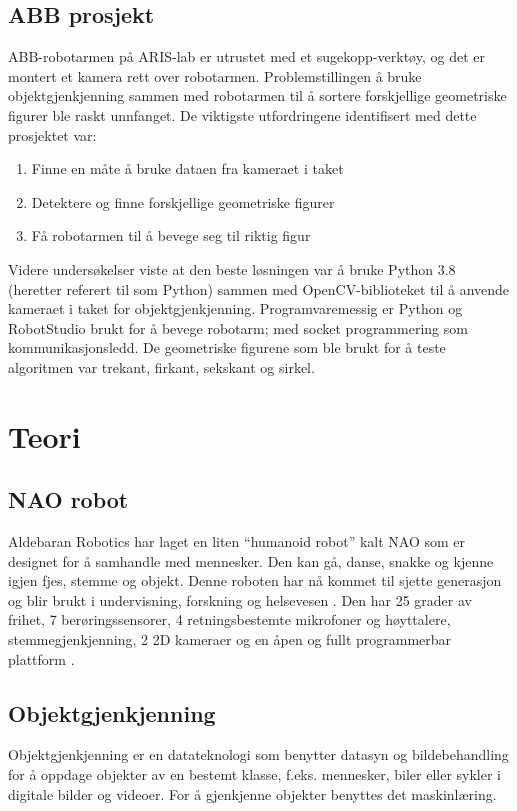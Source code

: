 \documentclass[conference]{IEEEtran}
\begin{document}
    \subsection{ABB prosjekt}
    ABB-robotarmen på ARIS-lab er utrustet med et sugekopp-verktøy, og det er montert et kamera rett over robotarmen. Problemstillingen å bruke objektgjenkjenning sammen med robotarmen til å sortere forskjellige geometriske figurer ble raskt unnfanget. De viktigste utfordringene identifisert med dette prosjektet var:
        \begin{enumerate}
            \item Finne en måte å bruke dataen fra kameraet i taket
            \item Detektere og finne forskjellige geometriske figurer
            \item Få robotarmen til å bevege seg til riktig figur
        \end{enumerate}
        Videre undersøkelser viste at den beste løsningen var å bruke Python 3.8 (heretter referert til som Python) sammen med OpenCV-biblioteket til å anvende kameraet i taket for objektgjenkjenning. Programvaremessig er Python og RobotStudio brukt for å bevege robotarm; med socket programmering som kommunikasjonsledd. De geometriske figurene som ble brukt for å teste algoritmen var trekant, firkant, sekskant og sirkel.

\section{Teori}

    \subsection{NAO robot}
        Aldebaran Robotics har laget en liten “humanoid robot” kalt NAO som er designet for å samhandle med mennesker. Den kan gå, danse, snakke og kjenne igjen fjes, stemme og objekt. Denne roboten har nå kommet til sjette generasjon og blir brukt i undervisning, forskning og helsevesen \cite{teori:NAO}. Den har 25 grader av frihet, 7 berøringssensorer, 4 retningsbestemte mikrofoner og høyttalere, stemmegjenkjenning, 2 2D kameraer og en åpen og fullt programmerbar plattform \cite{teori:SBNAO}.

    \subsection{Objektgjenkjenning}
        Objektgjenkjenning er en datateknologi som benytter datasyn og bildebehandling for å oppdage objekter av en bestemt klasse, f.eks. mennesker, biler eller sykler i digitale bilder og videoer. For å gjenkjenne objekter benyttes det maskinlæring. 
\end{document}
